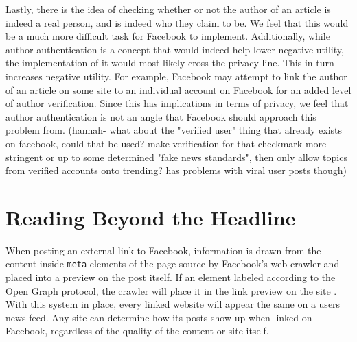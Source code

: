 \documentclass[12pt]{article}
\begin{document}
Lastly, there is the idea of checking whether or not the author of an article is indeed a real person, and is indeed who they claim to be. We feel that this would be a much more difficult task for Facebook to implement. Additionally, while author authentication is a concept that would indeed help lower negative utility, the implementation of it would most likely cross the privacy line. This in turn increases negative utility. For example, Facebook may attempt to link the author of an article on some site to an individual account on Facebook for an added level of author verification. Since this has implications in terms of privacy, we feel that author authentication is not an angle that Facebook should approach this problem from. (hannah- what about the "verified user" thing that already exists on facebook, could that be used? make verification for that checkmark more stringent or up to some determined "fake news standards", then only allow topics from verified accounts onto trending? has problems with viral user posts though)

\section{Reading Beyond the Headline}

When posting an external link to Facebook, information is drawn from the content inside \texttt{meta} elements of the page source by Facebook's web crawler and placed into a preview on the post itself. If an element labeled according to the Open Graph protocol, the crawler will place it in the link preview on the site \citep{fbwebmaster}. With this system in place, every linked website will appear the same on a users news feed. Any site can determine how its posts show up when linked on Facebook, regardless of the quality of the content or site itself. \\
\end{document}
